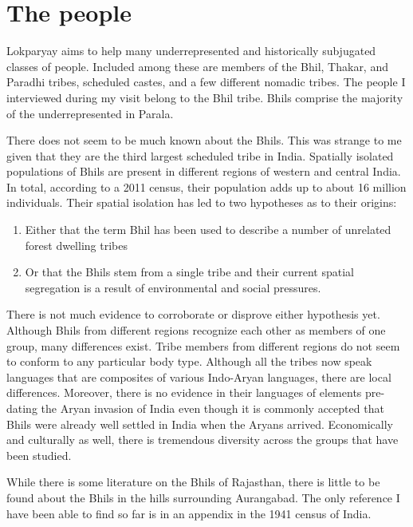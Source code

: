 \documentclass[report.tex]{subfiles}
\begin{document}
\section{The people}

Lokparyay aims to help many underrepresented and historically subjugated classes of people. Included among these are members of the Bhil, Thakar, and Paradhi tribes, scheduled castes, and a few different nomadic tribes. The people I interviewed during my visit belong to the Bhil tribe. Bhils comprise the majority of the underrepresented in Parala.

There does not seem to be much known about the Bhils. This was strange to me given that they are the third largest scheduled tribe in India. Spatially isolated populations of Bhils are present in different regions of western and central India. In total, according to a 2011 census, their population adds up to about 16 million individuals. Their spatial isolation has led to two hypotheses as to their origins:
\begin{enumerate}
\item Either that the term Bhil has been used to describe a number of unrelated forest dwelling tribes
\item Or that the Bhils stem from a single tribe and their current spatial segregation is a result of environmental and social pressures.
\end{enumerate}

There is not much evidence to corroborate or disprove either hypothesis yet. Although Bhils from different regions recognize each other as members of one group, many differences exist. Tribe members from different regions do not seem to conform to any particular body type. Although all the tribes now speak languages that are composites of various Indo-Aryan languages, there are local differences. Moreover, there is no evidence in their languages of elements pre-dating the Aryan invasion of India even though it is commonly accepted that Bhils were already well settled in India when the Aryans arrived. Economically and culturally as well, there is tremendous diversity across the groups that have been studied.

While there is some literature on the Bhils of Rajasthan, there is little to be found about the Bhils in the hills surrounding Aurangabad. The only reference I have been able to find so far is in an appendix in the 1941 census of India.
\end{document}
